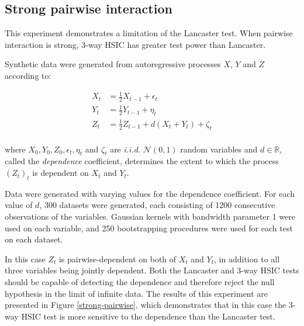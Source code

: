 \documentclass[]{article}
\begin{document}
\subsection{Strong pairwise interaction}\label{experiment3}
This experiment demonstrates a limitation of the Lancaster test. When pairwise interaction is strong, 3-way HSIC has greater test power than Lancaster.

Synthetic data were generated from autoregressive processes $X$, $Y$ and $Z$ according to:

\begin{align*}
X_t &= \frac{1}{2}X_{t-1} + \epsilon_t\\
Y_t &= \frac{1}{2}Y_{t-1} + \eta_t\\
Z_t &= \frac{1}{2}Z_{t-1} + d(X_t + Y_t) + \zeta_t\\
\end{align*}

where $X_0, Y_0, Z_0, \epsilon_t, \eta_t$ and $\zeta_t$ are \emph{i.i.d.} $\mathcal{N}(0,1)$ random variables and $d\in\mathbb{R}$, called the \emph{dependence} coefficient, determines the extent to which the process $(Z_t)_t$ is dependent on $X_t$ and $Y_t$.

Data were generated with varying values for the dependence coefficient. For each value of $d$, 300 datasets were generated, each consisting of 1200 consecutive observations of the variables. Gaussian kernels with bandwidth parameter 1 were used on each variable, and 250 bootstrapping procedures were used for each test on each dataset.

In this case $Z_t$ is pairwise-dependent on both of $X_t$ and $Y_t$, in addition to all three variables being jointly dependent. Both the Lancaster and 3-way HSIC tests should be capable of detecting the dependence and therefore reject the null hypothesis in the limit of infinite data. The results of this experiment are presented in Figure \ref{strong-pairwise}, which demonstrates that in this case the 3-way HSIC test is more sensitive to the dependence than the Lancaster test.
\end{document}
